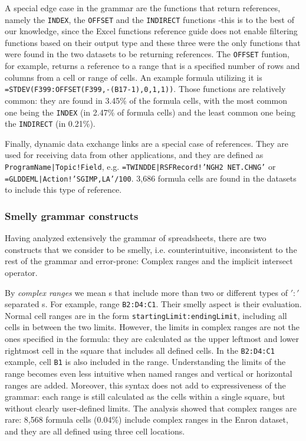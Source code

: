 \documentclass[conference]{IEEEtran}
\begin{document}
A special edge case in the grammar are the functions that return references, namely the \texttt{INDEX}, the \texttt{OFFSET} and the \texttt{INDIRECT} functions -this is to the best of our knowledge, since the Excel functions reference guide does not enable filtering functions based on their output type and these three were the only functions that were found in the two datasets to be returning references. The \texttt{OFFSET} funtion, for example, returns a reference to a range that is a specified number of rows and columns from a cell or range of cells. An example formula utilizing it is \texttt{=STDEV(F399:OFFSET(F399,-(B17-1),0,1,1))}. Those functions are relatively common: they are found in 3.45\% of the formula cells, with the most common one being the \texttt{INDEX} (in 2.47\% of formula cells) and the least common one being the \texttt{INDIRECT} (in 0.21\%).

Finally, dynamic data exchange links are a special case of references. They are used for receiving data from other applications, and they are defined as \texttt{ProgramName|Topic!Field}, e.g. \texttt{=TWINDDE|RSFRecord!'NGH2 NET.CHNG'} or \texttt{=GLDDEML|Action!'SGIMP,LA'/100}. 3,686 formula cells are found in the datasets to include this type of reference.

\subsubsection{Smelly grammar constructs}
Having analyzed extensively the grammar of spreadsheets, there are two constructs that we consider to be smelly, i.e. counterintuitive, inconsistent to the rest of the grammar and error-prone: Complex ranges and the implicit intersect operator.

By \textit{complex ranges} we mean s that include more than two or different types of $':'$ separated s. For example, range \texttt{B2:D4:C1}. Their smelly aspect is their evaluation. Normal cell ranges are in the form \texttt{startingLimit:endingLimit}, including all cells in between the two limits. However, the limits in complex ranges are not the ones specified in the formula: they are calculated as the upper leftmost and lower rightmost cell in the square that includes all defined cells. In the \texttt{B2:D4:C1} example, cell \texttt{B1} is also included in the range. Understanding the limits of the range becomes even less intuitive when named ranges and vertical or horizontal ranges are added. Moreover, this syntax does not add to expressiveness of the grammar: each range is still calculated as the cells within a single square, but without clearly user-defined limits. The analysis showed that complex ranges are rare: 8,568 formula cells	(0.04\%) include complex ranges in the Enron dataset, and they are all defined using three cell locations. 
\end{document}
